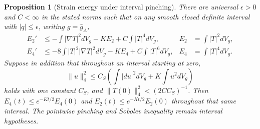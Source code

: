 \documentclass[11pt]{article}
\numberwithin{equation}{section}
\newtheorem{proposition}[theorem]{Proposition}
\theoremstyle{definition}
\theoremstyle{remark}
\begin{document}
\begin{proposition}[Strain energy under interval pinching]
\label{prop:strain-energy}
There are universal $\epsilon>0$ and $C<\infty$ in the stated norms
such that on any smooth closed definite interval with $|q|\leq\epsilon$,
writing $g=\widehat g_A$,
\begin{align}
 E_2'&\leq-\int|\nabla T|^2dV_g-KE_2+C\int|T|^4dV_g,
       &E_2&=\int|T|^2dV_g,\label{flow:strain-L2}\\
 E_4'&\leq-8\int|T|^2|\nabla T|^2dV_g-KE_4+C\int|T|^6dV_g,
       &E_4&=\int|T|^4dV_g.\label{flow:strain-L4}
\end{align}
Suppose in addition that throughout an interval starting at zero,
\[
 \|u\|_4^2\leq C_S\left(\int|du|^2dV_g+K\int u^2dV_g\right)
\]
holds with one constant $C_S$, and
$\|T(0)\|_4^2<(2CC_S)^{-1}$. Then
$E_4(t)\leq e^{-Kt/2}E_4(0)$ and $E_2(t)\leq e^{-Kt/2}E_2(0)$
throughout that same interval. The pointwise pinching and Sobolev
inequality remain interval hypotheses.
\end{proposition}
\end{document}
